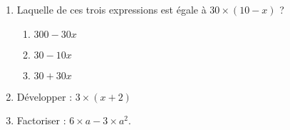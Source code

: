 
\begin{exercice}\label{exosmath-0969}

    \begin{enumerate}
        \item
            Laquelle de ces trois expressions est égale à \(  30\times (10-x)  \) ?
            \begin{enumerate}
                \item   \label{IXCEooMPdVln}
                    \( 300-30x\)
                \item
                    \( 30-10x\)
                \item
                    \( 30+30x\)
            \end{enumerate}
        \item
            Développer : \( 3\times (x+2)\)
        \item
            Factoriser : \( 6\times a-3\times a^2\).
    \end{enumerate}

\end{exercice}

